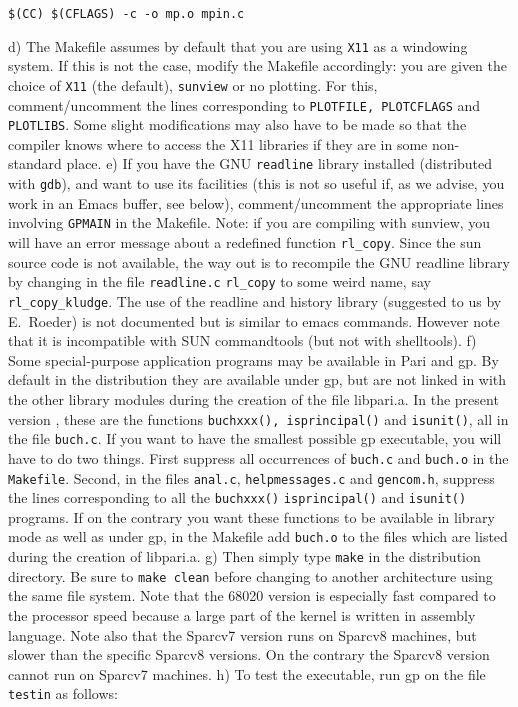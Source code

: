 \centerline{\tt \$(CC) \$(CFLAGS) -c -o mp.o mpin.c}
\medskip
   d) The Makefile assumes by default that you are using {\tt X11} as a 
      windowing system. If this is not the case, modify the Makefile 
      accordingly: you are given the choice of {\tt X11} (the default), 
      {\tt sunview} or no plotting. For this, comment/uncomment the lines
      corresponding to {\tt PLOTFILE, PLOTCFLAGS} and {\tt PLOTLIBS}.
      Some slight modifications may also have to be made so that the compiler 
      knows where to access the X11 libraries if they are in some non-standard
      place.
\medskip
   e) If you have the GNU {\tt readline} library installed (distributed with
     {\tt gdb}), and want to use its facilities (this is not so useful if, as
      we advise, you work in an Emacs buffer, see below), comment/uncomment the
      appropriate lines involving {\tt GPMAIN} in the Makefile.
      Note: if you are compiling with sunview, you will have an error message
      about a redefined function {\tt rl\_copy}.
      Since the sun source code is not available, the way out is to recompile
      the GNU readline library by changing in the file {\tt readline.c}
      {\tt rl\_copy} to some weird name, say {\tt rl\_copy\_kludge}.
      The use of the readline and history library (suggested to us by 
      E.~Roeder) is not documented but is similar to emacs commands. However
      note that it is incompatible with SUN commandtools (but not with
      shelltools).
\medskip
   f) Some special-purpose application programs may be available in Pari and
      gp. By default in the distribution they are available under gp, but are
      not linked in with the other library modules during the creation of the
      file libpari.a. In the present version \vers{}, these are the functions
      {\tt buchxxx(), isprincipal()} and {\tt isunit()}, all
      in the file {\tt buch.c}. If you want to have the smallest possible gp 
      executable, you will have to do two things. First suppress all 
      occurrences of {\tt buch.c} and {\tt buch.o} in the {\tt Makefile}.
      Second, in the files {\tt anal.c}, {\tt helpmessages.c} and 
     {\tt gencom.h}, suppress the lines corresponding to all the 
     {\tt buchxxx()} {\tt isprincipal()} and {\tt isunit()} programs.
      If on the contrary you want these functions to be available in library
      mode as well as under gp, in the Makefile add {\tt buch.o} to the files
      which are listed during the creation of libpari.a.
\medskip
   g) Then simply type {\tt make} in the distribution directory. Be sure to 
      {\tt make clean} before changing to another architecture using the same
      file system. Note that the 68020 version is especially fast compared
      to the processor speed because a large part of the kernel is written in
      assembly language.  Note also that the Sparcv7 version runs on Sparcv8
      machines, but slower than the specific Sparcv8 versions. On the contrary
      the Sparcv8 version cannot run on Sparcv7 machines.
\medskip
   h) To test the executable, run gp on the file {\tt testin} as follows:

